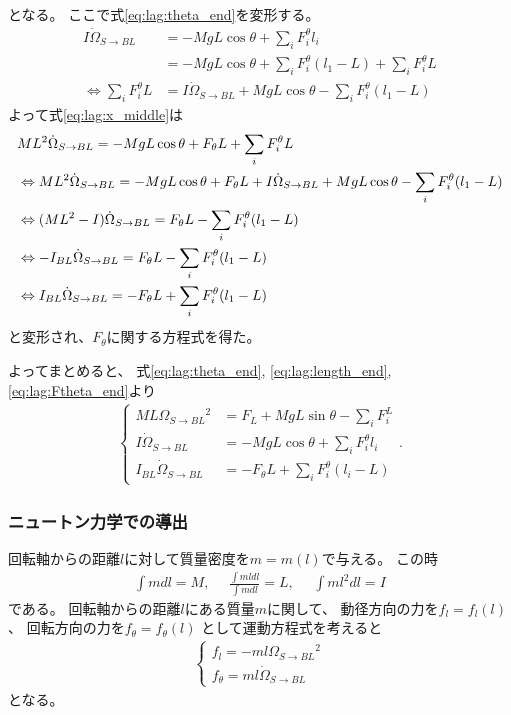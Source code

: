 \documentclass[a4paper,11pt]{jsarticle}
\begin{document}
となる。
ここで式\ref{eq:lag:theta_end}を変形する。
\begin{align*}
  I\dot\Omega_{S\rightarrow BL}{} 
  &= -MgL\cos\theta + \sum_i F_i^\theta l_i
  \\
  &= -MgL\cos\theta + \sum_i F_i^\theta (l_1 - L) + \sum_i F_i^\theta L
  \\
  \Leftrightarrow
  \sum_i F_i^\theta L
  &= I\dot\Omega_{S\rightarrow BL}{} + MgL\cos\theta - \sum_i F_i^\theta (l_1 - L)
\end{align*}
よって式\ref{eq:lag:x_middle}は
\begin{align}
  & M L^2 \dot\Omega_{S\rightarrow BL}{} = - Mg L \cos\theta + F_\theta L + \sum_i F_i^\theta L
  \notag
  \\
  & \Leftrightarrow
  M L^2 \dot\Omega_{S\rightarrow BL}{} = - Mg L \cos\theta + F_\theta L + I\dot\Omega_{S\rightarrow BL}{} + MgL\cos\theta - \sum_i F_i^\theta (l_1 - L)
  \notag
  \\
  & \Leftrightarrow
  ( M L^2 - I ) \dot\Omega_{S\rightarrow BL}{} = F_\theta L - \sum_i F_i^\theta (l_1 - L)
  \notag
  \\
  & \Leftrightarrow
  -I_{BL} \dot\Omega_{S\rightarrow BL}{} = F_\theta L - \sum_i F_i^\theta (l_1 - L)
  \notag
  \\
  & \Leftrightarrow
  I_{BL} \dot\Omega_{S\rightarrow BL}{} = - F_\theta L + \sum_i F_i^\theta (l_1 - L)
  \label{eq:lag:Ftheta_end}
\end{align}
と変形され、$F_\theta$に関する方程式を得た。

よってまとめると、
式\ref{eq:lag:theta_end}, \ref{eq:lag:length_end}, \ref{eq:lag:Ftheta_end}より
\begin{align*}
  \begin{cases}
    ML\Omega_{S\rightarrow BL}{}^2 &= F_L + MgL\sin\theta - \sum_i F_i^L
    \\
    I\dot\Omega_{S\rightarrow BL}{} &= -MgL\cos\theta + \sum_i F_i^\theta l_i
    \\
    I_{BL}\dot\Omega_{S\rightarrow BL}{} &= -F_\theta L + \sum_i F_i^\theta ( l_i - L )
  \end{cases}.
\end{align*}

\clearpage
\subsubsection{ニュートン力学での導出}
\label{subsubsec:newton}

回転軸からの距離$l$に対して質量密度を$m=m(l)$で与える。
この時
\begin{align*}
  \int m dl = M, \ \ \ \ \ \
  \frac{\int ml dl}{\int m dl} = L, \ \ \ \ \ \
  \int ml^2 dl = I
\end{align*}
である。
回転軸からの距離$l$にある質量$m$に関して、
動径方向の力を$f_l=f_l(l)$、
回転方向の力を$f_\theta=f_\theta(l)$
として運動方程式を考えると
\begin{align*}
  \begin{cases}
    f_l = -ml\Omega_{S\rightarrow BL}{}^2
    \\
    f_\theta = ml\dot\Omega_{S\rightarrow BL}{}
  \end{cases}
\end{align*}
となる。
\end{document}
